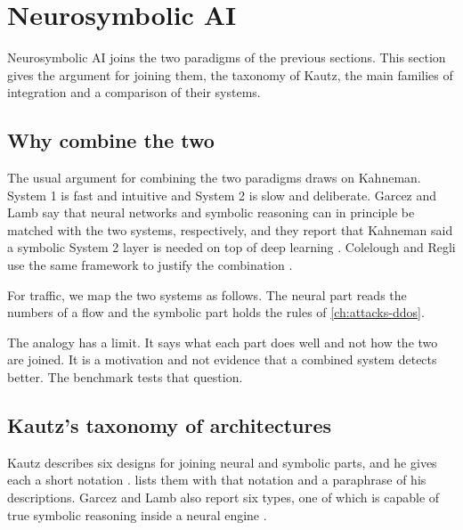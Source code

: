 \section{Neurosymbolic AI}
\label{sec:neurosymbolic-ai}

Neurosymbolic AI joins the two paradigms of the previous sections. This section gives the
argument for joining them, the taxonomy of Kautz, the main families of integration and a
comparison of their systems.

\subsection{Why combine the two}
\label{sec:complementarity}

The usual argument for combining the two paradigms draws on Kahneman. System 1
is fast and intuitive and System 2 is slow and deliberate. Garcez and Lamb
say that neural networks and symbolic reasoning can in principle be matched
with the two systems, respectively, and they report that Kahneman said a
symbolic System 2 layer is needed on top of deep learning
\citep{garcez2020thirdwave}. Colelough and Regli use the same framework to
justify the combination \citep{colelough2025neurosymbolic2024}.

For traffic, we map the two systems as follows. The neural part reads the
numbers of a flow and the symbolic part holds the rules of
\cref{ch:attacks-ddos}.

The analogy has a limit. It says what each part does well and not how the two
are joined. It is a motivation and not evidence that a combined system
detects better. The benchmark tests that question.

\subsection{Kautz's taxonomy of architectures}
\label{sec:kautz-taxonomy}

Kautz describes six designs for joining neural and symbolic parts, and he
gives each a short notation \citep{kautz2022third}. 
lists them with that notation and a paraphrase of his descriptions. Garcez and
Lamb also report six types, one of which is capable of true symbolic reasoning
inside a neural engine \citep{garcez2020thirdwave}.

